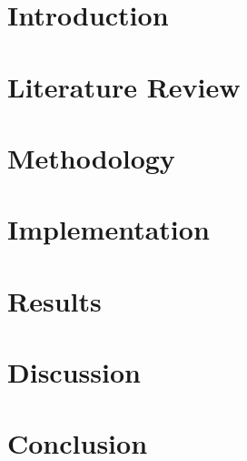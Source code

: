 \documentclass[12pt,a4paper]{article}
\begin{document}




\section{Introduction}

\section{Literature Review}

\section{Methodology}

\section{Implementation}

\section{Results}

\section{Discussion}

\section{Conclusion}


% 


% 
% 
\end{document}
